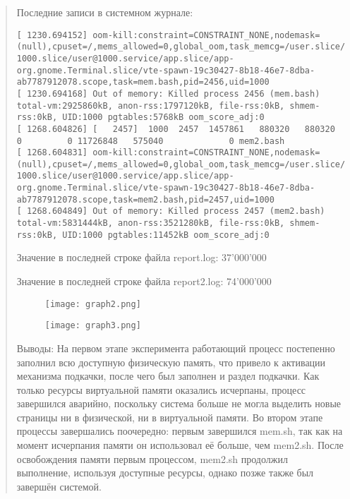 \documentclass[12pt]{article}
\begin{document}
\begin{quote}
Последние записи в системном журнале:
\begin{lstlisting}
[ 1230.694152] oom-kill:constraint=CONSTRAINT_NONE,nodemask=(null),cpuset=/,mems_allowed=0,global_oom,task_memcg=/user.slice/user-1000.slice/user@1000.service/app.slice/app-org.gnome.Terminal.slice/vte-spawn-19c30427-8b18-46e7-8dba-ab7787912078.scope,task=mem.bash,pid=2456,uid=1000
[ 1230.694168] Out of memory: Killed process 2456 (mem.bash) total-vm:2925860kB, anon-rss:1797120kB, file-rss:0kB, shmem-rss:0kB, UID:1000 pgtables:5768kB oom_score_adj:0
[ 1268.604826] [   2457]  1000  2457  1457861   880320   880320        0         0 11726848   575040             0 mem2.bash
[ 1268.604831] oom-kill:constraint=CONSTRAINT_NONE,nodemask=(null),cpuset=/,mems_allowed=0,global_oom,task_memcg=/user.slice/user-1000.slice/user@1000.service/app.slice/app-org.gnome.Terminal.slice/vte-spawn-19c30427-8b18-46e7-8dba-ab7787912078.scope,task=mem2.bash,pid=2457,uid=1000
[ 1268.604849] Out of memory: Killed process 2457 (mem2.bash) total-vm:5831444kB, anon-rss:3521280kB, file-rss:0kB, shmem-rss:0kB, UID:1000 pgtables:11452kB oom_score_adj:0
\end{lstlisting}

Значение в последней строке файла report.log: 37'000'000

Значение в последней строке файла report2.log: 74'000'000

\begin{figure}[h]
    \centering
    \texttt{[image: graph2.png]}
    \label{fig:example}
\end{figure}

\begin{figure}[h]
    \centering
    \texttt{[image: graph3.png]}
    \label{fig:example}
\end{figure}

\clearpage

Выводы: На первом этапе эксперимента работающий процесс постепенно заполнил всю доступную физическую память, что привело к активации механизма подкачки, после чего был заполнен и раздел подкачки. Как только ресурсы виртуальной памяти оказались исчерпаны, процесс завершился аварийно, поскольку система больше не могла выделить новые страницы ни в физической, ни в виртуальной памяти.
Во втором этапе процессы завершались поочередно: первым завершился mem.sh, так как на момент исчерпания памяти он использовал её больше, чем mem2.sh. После освобождения памяти первым процессом, mem2.sh продолжил выполнение, используя доступные ресурсы, однако позже также был завершён системой.


\end{quote}
\end{document}
